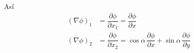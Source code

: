 Así
\begin{align*}
  (\nabla\phi)_1
  &=
    \dfrac{\partial\phi}{\partial x_1}
    = \dfrac{\partial\phi}{\partial x}\\
  (\nabla\phi)_2
  &=
    \dfrac{\partial\phi}{\partial x_2}
    = \cos\alpha\,\dfrac{\partial\phi}{\partial x}
    + \sin\alpha\,\dfrac{\partial\phi}{\partial y}
\end{align*}



